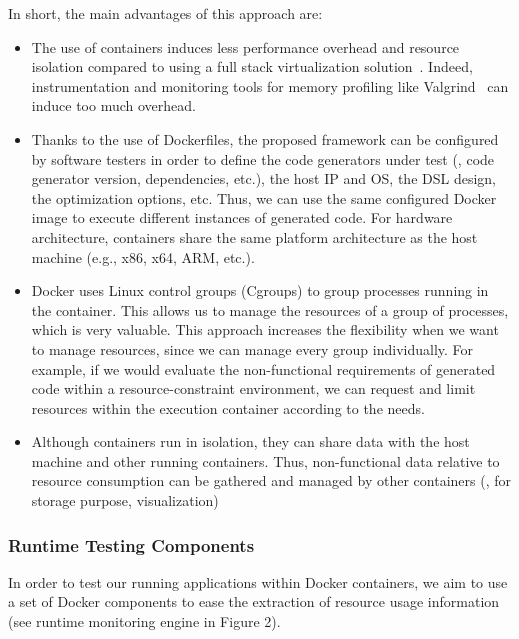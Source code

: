 In short, the main advantages of this approach are:
\begin{itemize}
	\item The use of containers induces less performance overhead and resource isolation compared to using a full stack virtualization solution~\cite{spoiala2016performance}. Indeed, instrumentation and monitoring tools for memory profiling like Valgrind~\cite{nethercote2007valgrind} can induce too much overhead.
	\item Thanks to the use of Dockerfiles, the proposed framework can be  configured by software testers in order to define the code generators under test (\eg, code generator version, dependencies, etc.), the host IP and OS, the DSL design, the optimization options, etc. Thus, we can use the same configured Docker image to execute different instances of generated code. For hardware architecture, containers share the same platform architecture as the host machine (e.g., x86, x64, ARM, etc.). 
	\item Docker uses Linux control groups (Cgroups) to group processes running in the container. This allows us to manage the resources of a group of processes, which is very valuable. 
	This approach increases the flexibility when we want to manage resources, since we can manage every group individually. For example, if we would evaluate the non-functional requirements of generated code within a resource-constraint environment, we can  request and limit resources within the execution container according to the needs.
	\item Although containers run in isolation, they can share data with the host machine and other running containers. Thus, non-functional data relative to resource consumption can be gathered and managed by other containers (\ie, for storage purpose, visualization)
\end{itemize}




\subsubsection{Runtime Testing Components}
In order to test our running applications within Docker containers, we aim to use a set of Docker components to ease the extraction of resource usage information (see runtime monitoring engine in Figure 2).

